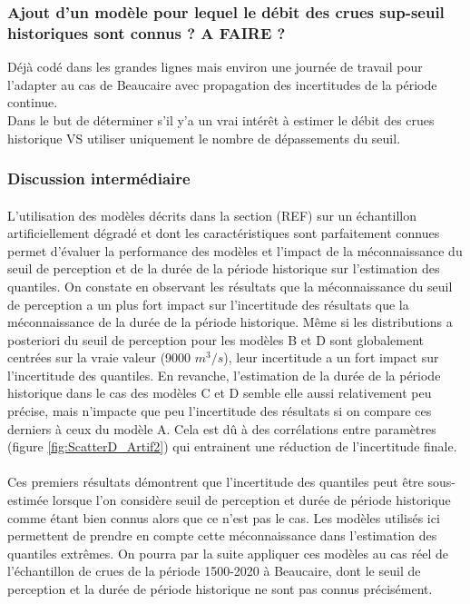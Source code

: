 \documentclass[11pt]{article}
\begin{document}
\FloatBarrier

	\subsubsection{Ajout d'un modèle pour lequel le débit des crues sup-seuil historiques sont connus ? A FAIRE ?}
	Déjà codé dans les grandes lignes mais environ une journée de travail pour l'adapter au cas de Beaucaire avec propagation des incertitudes de la période continue.\\
	
	Dans le but de déterminer s'il y'a un vrai intérêt à estimer le débit des crues historique VS utiliser uniquement le nombre de dépassements du seuil.

	\subsubsection{Discussion intermédiaire}
	
	\paragraph{} L'utilisation des modèles décrits dans la section (REF) sur un échantillon artificiellement dégradé et dont les caractéristiques sont parfaitement connues permet d'évaluer la performance des modèles et l'impact de la méconnaissance du seuil de perception et de la durée de la période historique sur l'estimation des quantiles. On constate en observant les résultats que la méconnaissance du seuil de perception a un plus fort impact sur l'incertitude des résultats que la méconnaissance de la durée de la période historique. Même si les distributions a posteriori du seuil de perception pour les modèles B et D sont globalement centrées sur la vraie valeur (9000 $m^3/s$), leur incertitude a un fort impact sur l'incertitude des quantiles. En revanche, l'estimation de la durée de la période historique dans le cas des modèles C et D semble elle aussi relativement peu précise, mais n'impacte que peu l'incertitude des résultats si on compare ces derniers à ceux du modèle A. Cela est dû à des corrélations entre paramètres (figure \ref{fig:ScatterD_Artif2}) qui entrainent une réduction de l'incertitude finale.
	 
	\paragraph{} Ces premiers résultats démontrent que l'incertitude des quantiles peut être sous-estimée	lorsque l'on considère seuil de perception et durée de période historique comme étant bien connus alors que ce n'est pas le cas. Les modèles utilisés ici permettent de prendre en compte cette méconnaissance dans l'estimation des quantiles extrêmes. On pourra par la suite appliquer ces modèles au cas réel de l'échantillon de crues de la période 1500-2020 à Beaucaire, dont le seuil de perception et la durée de période historique ne sont pas connus précisément. 
	
\end{document}
